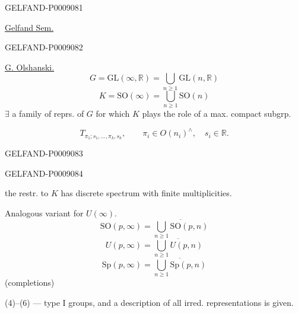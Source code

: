 \begin{GelfandAdjacentEvidence}{GELFAND-P000908}{1}

\quad\uline{Gelfand Sem.}
\end{GelfandAdjacentEvidence}
\begin{GelfandAdjacentEvidence}{GELFAND-P000908}{2}


\uline{G. Olshanski.}
\begin{equation*}
G=\mathrm{GL}(\infty,\mathbb R)=\bigcup_{n\ge1}\mathrm{GL}(n,\mathbb R)
\tag{1}
\end{equation*}
\begin{equation*}
K=\mathrm{SO}(\infty)=\bigcup_{n\ge1}\mathrm{SO}(n)
\tag{2}
\end{equation*}
$\exists$ a family of reprs. of $G$ for which $K$ plays the role of a max. compact subgrp.

\begin{equation*}
T_{\pi_1;s_1,\ldots,\pi_k,s_k},\qquad
\pi_i\in O(n_i)^{\wedge},\quad s_i\in\mathbb R.
\tag{3}
\end{equation*}
\end{GelfandAdjacentEvidence}
\begin{GelfandAdjacentEvidence}{GELFAND-P000908}{3}


\end{GelfandAdjacentEvidence}
\begin{GelfandAdjacentEvidence}{GELFAND-P000908}{4}

the restr. to $K$ has discrete spectrum with finite multiplicities.

Analogous variant for $U(\infty)$.
\begin{equation*}
\mathrm{SO}(p,\infty)=\overline{\bigcup_{n\ge1}\mathrm{SO}(p,n)}
\tag{4}
\end{equation*}
\begin{equation*}
U(p,\infty)=\overline{\bigcup_{n\ge1}U(p,n)}
\tag{5}
\end{equation*}
\begin{equation*}
\mathrm{Sp}(p,\infty)=\overline{\bigcup_{n\ge1}\mathrm{Sp}(p,n)}
\tag{6}
\end{equation*}
(completions)

(4)–(6) --- type I groups, and a description of all irred. representations is given.
\end{GelfandAdjacentEvidence}
